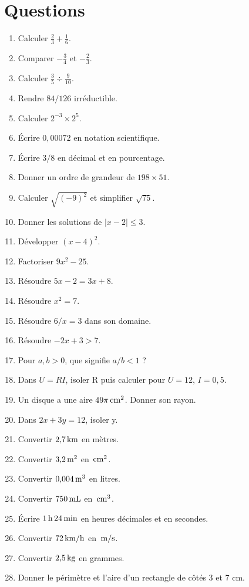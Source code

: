 \documentclass[11pt,a4paper,oneside]{book}
\begin{document}
\section{Questions}
\begin{enumerate}
\item Calculer $\frac23+\frac16$.
\item Comparer $-\frac34$ et $-\frac23$.
\item Calculer $\frac35\div\frac9{10}$.
\item Rendre $84/126$ irréductible.
\item Calculer $2^{-3}\times2^5$.
\item Écrire $0{,}00072$ en notation scientifique.
\item Écrire $3/8$ en décimal et en pourcentage.
\item Donner un ordre de grandeur de $198\times51$.
\item Calculer $\sqrt{(-9)^2}$ et simplifier $\sqrt{75}$.
\item Donner les solutions de $|x-2|\le3$.
\item Développer $(x-4)^2$.
\item Factoriser $9x^2-25$.
\item Résoudre $5x-2=3x+8$.
\item Résoudre $x^2=7$.
\item Résoudre $6/x=3$ dans son domaine.
\item Résoudre $-2x+3>7$.
\item Pour $a,b>0$, que signifie $a/b<1$ ?
\item Dans $U=RI$, isoler R puis calculer pour $U=12$, $I=0{,}5$.
\item Un disque a une aire $49\pi\,\mathrm{cm^2}$. Donner son rayon.
\item Dans $2x+3y=12$, isoler y.
\item Convertir $2{,}7\,\mathrm{km}$ en mètres.
\item Convertir $3{,}2\,\mathrm{m^2}$ en $\,\mathrm{cm^2}$.
\item Convertir $0{,}004\,\mathrm{m^3}$ en litres.
\item Convertir $750\,\mathrm{mL}$ en $\,\mathrm{cm^3}$.
\item Écrire $1\,\mathrm{h}\,24\,\mathrm{min}$ en heures décimales et en secondes.
\item Convertir $72\,\mathrm{km/h}$ en $\,\mathrm{m/s}$.
\item Convertir $2{,}5\,\mathrm{kg}$ en grammes.
\item Donner le périmètre et l'aire d'un rectangle de côtés $3$ et $7$ cm.

\end{enumerate}
\end{document}
